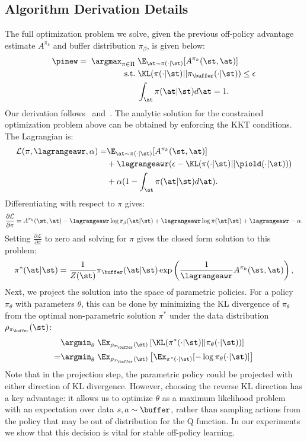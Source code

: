 \subsection{Algorithm Derivation Details} \label{sec:derivation}

The full optimization problem we solve, given the previous off-policy advantage estimate $A^{\pi_k}$ and buffer distribution $\pi_\beta$, is given below:
\begin{align}
    \pinew = \; \argmax_{\pi \in \Pi} \; & \E_{\at \sim \pi(\cdot|\st)}[A^{\pi_k}(\st, \at)] \\
    \text{s.t.} \; & \KL(\pi(\cdot|\st)||\pi_\buffer(\cdot|\st)) \leq \epsilon \\
    & \int_\at \pi(\at|\st) d\at = 1.
\end{align}
Our derivation follows~\citet{peters2010reps} and~\citet{peng2019awr}. The analytic solution for the constrained optimization problem above can be obtained by enforcing the KKT conditions. The Lagrangian is:
\begin{align}
    \mathcal{L}(\pi, \lagrangeawr, \alpha) = & \E_{\at \sim \pi(\cdot|\st)}[A^{\pi_k}(\st, \at)] \\ & + \lagrangeawr(\epsilon - \KL(\pi(\cdot|\st)||\piold(\cdot|\st))) \\ & + \alpha (1 - \int_\at \pi(\at|\st) d\at).
\end{align}
Differentiating with respect to $\pi$ gives:
\begin{align}
    \frac{\partial \mathcal{L}}{\partial \pi} = A^{\pi_k}(\st, \at) - \lagrangeawr \log \pi_\beta(\at|\st) + \lagrangeawr \log \pi(\at|\st) + \lagrangeawr - \alpha.
\end{align}
Setting $\frac{\partial \mathcal{L}}{\partial \pi}$ to zero and solving for $\pi$ gives the closed form solution to this problem:
\begin{align}
    \label{eqn:closedform}
    \pi^*(\at|\st) = \frac{1}{Z(\st)} \pi_\buffer(\at|\st)\exp\left(\frac{1}{\lagrangeawr} A^{\pi_k}(\st, \at)\right),
\end{align}
Next, we project the solution into the space of parametric policies. For a policy $\pi_\theta$ with parameters $\theta$, this can be done by minimizing the KL divergence of $\pi_{\theta}$ from the optimal non-parametric solution $\pi^*$ under the data distribution $\rho_{\pi_\buffer}(\st)$: 
\begin{align}
    & \argmin_\theta \; \Ex_{\rho_{\pi_\buffer}(\st) } \left[\KL(\pi^*(\cdot|\st)||\pi_\theta(\cdot|\st))\right] \\ = & 
    \argmin_\theta \; \Ex_{\rho_{\pi_\buffer}(\st)} \left[\Ex_{\pi^*(\cdot|\st)}[-\log \pi_\theta(\cdot|\st)]\right]
\end{align}
Note that in the projection step, the parametric policy could be projected with either direction of KL divergence. However, choosing the reverse KL direction has a key advantage: it allows us to optimize $\theta$ as a maximum likelihood problem with an expectation over data $s, a \sim \buffer$, rather than sampling actions from the policy that may be out of distribution for the Q function. In our experiments we show that this decision is vital for stable off-policy learning.

